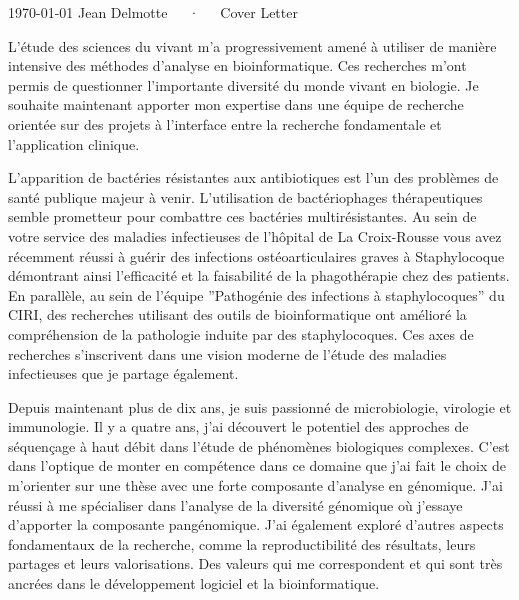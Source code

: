 \documentclass[11pt, a4paper]{awesome-cv}
\begin{document}
\makecvheader[R]

\makecvfooter
  {\today}
  {Jean Delmotte~~~·~~~Cover Letter}
  {\thepage}
\makelettertitle

\begin{cvletter}

L’étude des sciences du vivant m’a progressivement amené à utiliser de manière intensive des méthodes d’analyse en bioinformatique. Ces recherches m’ont permis de questionner l’importante diversité du monde vivant en biologie. Je souhaite maintenant apporter mon expertise dans une équipe de recherche orientée sur des projets à l’interface entre la recherche fondamentale et l’application clinique.


L’apparition de bactéries résistantes aux antibiotiques est l’un des problèmes de santé publique majeur à venir. L’utilisation de bactériophages thérapeutiques semble prometteur pour combattre ces bactéries multirésistantes. Au sein de votre service des maladies infectieuses de l’hôpital de La Croix-Rousse vous avez récemment réussi à guérir des infections ostéoarticulaires graves à Staphylocoque démontrant ainsi l'efficacité et la faisabilité de la phagothérapie chez des patients. En parallèle, au sein de l’équipe ”Pathogénie des infections à staphylocoques” du CIRI, des recherches utilisant des outils de bioinformatique ont amélioré la compréhension de la pathologie induite par des staphylocoques. Ces axes de recherches s’inscrivent dans une vision moderne de l’étude des maladies infectieuses que je partage également.


Depuis maintenant plus de dix ans, je suis passionné de microbiologie, virologie et immunologie. Il y a quatre ans, j’ai découvert le potentiel des approches de séquençage à haut débit dans l’étude de phénomènes biologiques complexes. C’est dans l’optique de monter en compétence dans ce domaine que j’ai fait le choix de m’orienter sur une thèse avec une forte composante d’analyse en génomique. J’ai réussi à me spécialiser dans l’analyse de la diversité génomique où j’essaye d’apporter la composante pangénomique. J'ai également exploré d'autres aspects fondamentaux de la recherche, comme la reproductibilité des résultats, leurs partages et leurs valorisations. Des valeurs qui me correspondent et qui sont très ancrées dans le développement logiciel et la bioinformatique.


\end{cvletter}
\end{document}

